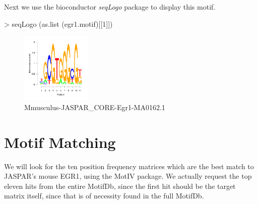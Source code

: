 \documentclass{article}
\renewenvironment{Schunk}{\vspace{\topsep}}{\vspace{\topsep}}
\begin{document}
Next we use the bioconductor \emph{seqLogo} package to display this motif.

\begin{Schunk}
\begin{Sinput}
> seqLogo (as.list (egr1.motif)[[1]])
\end{Sinput}
\end{Schunk}

\begin{figure}[htpb!]
  \centering
  \includegraphics[width=0.3\textwidth]{MotifDb-egr1}
  \caption{Mmusculus-JASPAR\_CORE-Egr1-MA0162.1}
\end{figure}
  
\section{Motif Matching}
We will look for the ten position frequency matrices which are the best match to JASPAR's mouse EGR1, using
the MotIV package.  We actually request the top eleven hits from the entire MotifDb, since the first hit 
should be the target matrix itself, since that is of necessity found in the full MotifDb.
\end{document}
